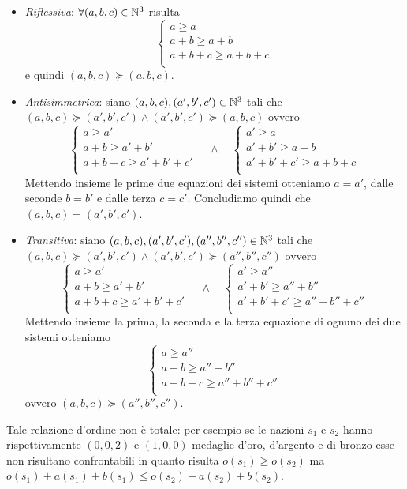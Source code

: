 \begin{itemize}
\item \emph{Riflessiva}: $ \forall (a, b, c) \in \mathbb{N}^3 $ risulta
  \[\begin{cases*}
      a \geq a \\
      a + b \geq a + b \\
      a + b + c \geq a + b + c \\
    \end{cases*}\]
  e quindi $ (a, b, c) \succeq (a, b, c) $.
\item \emph{Antisimmetrica}: siano $ (a, b, c), (a', b', c') \in \mathbb{N}^3 $ tali che $ (a, b, c) \succeq (a', b', c') \wedge (a', b', c') \succeq (a, b, c) $ ovvero
  \[\begin{cases*}
      a \geq a' \\
      a + b \geq a' + b' \\
      a + b + c \geq a' + b' + c' \\
    \end{cases*}
    \quad \wedge \quad
    \begin{cases*}
      a' \geq a \\
      a' + b' \geq a + b \\
      a' + b' + c' \geq a + b + c \\
    \end{cases*}\]
  Mettendo insieme le prime due equazioni dei sistemi otteniamo $ a = a' $, dalle seconde $ b = b' $ e dalle terza $ c = c' $. Concludiamo quindi che $ (a, b, c) = (a', b', c') $.
\item \emph{Transitiva}: siano $ (a, b, c), (a', b', c'), (a'', b'', c'') \in \mathbb{N}^3 $ tali che $ (a, b, c) \succeq (a', b', c') \wedge (a', b', c') \succeq (a'', b'', c'') $ ovvero
  \[\begin{cases*}
      a \geq a' \\
      a + b \geq a' + b' \\
      a + b + c \geq a' + b' + c' \\
    \end{cases*}
    \quad \wedge \quad
    \begin{cases*}
      a' \geq a'' \\
      a' + b' \geq a'' + b'' \\
      a' + b' + c' \geq a'' + b'' + c'' \\
    \end{cases*}\]
  Mettendo insieme la prima, la seconda e la terza equazione di ognuno dei due sistemi otteniamo
  \[\begin{cases*}
      a \geq a'' \\
      a + b \geq a'' + b'' \\
      a + b + c \geq a'' + b'' + c'' \\
    \end{cases*}\]
  ovvero $ (a, b, c) \succeq (a'', b'', c'') $.
\end{itemize}
Tale relazione d'ordine non è totale: per esempio se le nazioni $ s_1 $ e $ s_2 $ hanno rispettivamente $ (0, 0, 2) $ e $ (1, 0, 0) $ medaglie d'oro, d'argento e di bronzo esse non risultano confrontabili in quanto risulta $ o(s_1) \geq o(s_2) $ ma $ o(s_1) + a(s_1) + b(s_1) \leq o(s_2) + a(s_2) + b(s_2) $.\\

